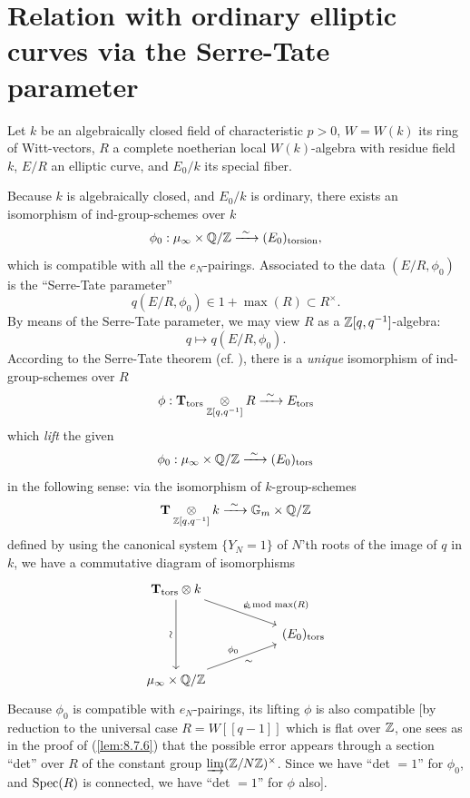 \section{Relation with ordinary elliptic curves via the Serre-Tate parameter}
\label{sec:8.9}

Let $k$ be an algebraically closed field of characteristic $p > 0$, $W = W(k)$ its ring of Witt-vectors, $R$ a complete noetherian local $W(k)$-algebra with residue field $k$, $E/R$ an elliptic curve, and $E_0/k$ its special fiber.

Because $k$ is algebraically closed, and $E_0/k$ is ordinary, there exists an isomorphism of ind-group-schemes over $k$
\[
\phi_0 : \mu_{\infty} \times \mathbb{Q}/\mathbb{Z} \xrightarrow{\ \sim\ } (E_0)_{\mathrm{torsion}} ,
\]
which is compatible with all the $e_N$-pairings. Associated to the data $(E/R, \phi_0)$ is the ``Serre-Tate parameter''
\[
q(E/R, \phi_0) \in 1 + \max(R) \subset R^{\times} .
\]
By means of the Serre-Tate parameter, we may view $R$ as a $\mathbb{Z}[q,q^{-1}]$-algebra:
\[
q \mapsto q(E/R, \phi_0) .
\]
According to the Serre-Tate theorem (cf. \cite{K5}), there is a \emph{unique} isomorphism of ind-group-schemes over $R$
\[
\phi : \mathbf{T}_{\mathrm{tors}} \underset{\mathbb{Z}[q,q^{-1}]}{\otimes} R \xrightarrow{\ \sim\ } E_{\mathrm{tors}}
\]
which \emph{lift} the given
\[
\phi_0 : \mu_{\infty} \times \mathbb{Q}/\mathbb{Z} \xrightarrow{\ \sim\ } (E_0)_{\mathrm{tors}}
\]
in the following sense: via the isomorphism of $k$-group-schemes
\[
\mathbf{T} \underset{\mathbb{Z}[q,q^{-1}]}{\otimes} k \xrightarrow{\ \sim\ } \mathbb{G}_m \times \mathbb{Q}/\mathbb{Z}
\]
defined by using the canonical system $\{Y_N = 1\}$ of $N$'th roots of the image of $q$ in $k$, we have a commutative diagram of isomorphisms
\[
\begin{tikzcd}[column sep=5.2em, row sep=1.9em]
\mathbf{T}_{\mathrm{tors}} \otimes k
  \arrow[dr, "\phi \bmod \max(R)", "\sim"]
  \arrow[dd, "\rotatebox{90}{$\sim$}"'] & \\
& (E_0)_{\mathrm{tors}} \\
\mu_{\infty} \times \Q/\Z
  \arrow[ur, "\phi_0", "\sim"'] &
\end{tikzcd}
\]
Because $\phi_0$ is compatible with $e_N$-pairings, its lifting $\phi$ is also compatible [by reduction to the universal case $R = W[[q-1]]$ which is flat over $\mathbb{Z}$, one sees as in the proof of (\ref{lem:8.7.6}) that the possible error appears through a section ``det'' over $R$ of the constant group $\varinjlim (\mathbb{Z}/N\mathbb{Z})^{\times}$. Since we have ``det $= 1$'' for $\phi_0$, and $\operatorname{Spec}(R)$ is connected, we have ``det $= 1$'' for $\phi$ also].

